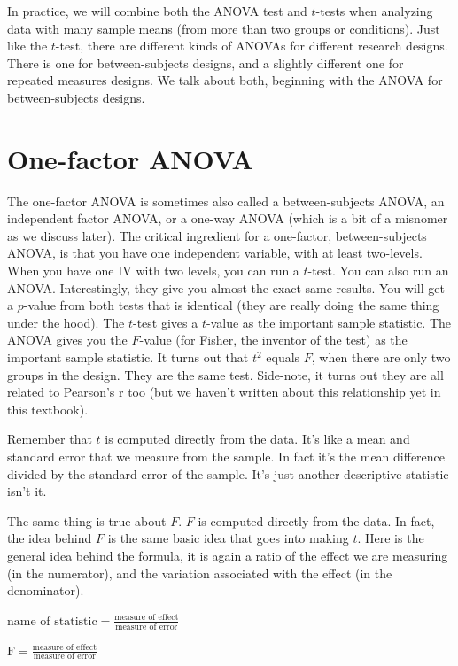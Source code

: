\documentclass[]{book}
\begin{document}
In practice, we will combine both the ANOVA test and \(t\)-tests when analyzing data with many sample means (from more than two groups or conditions). Just like the \(t\)-test, there are different kinds of ANOVAs for different research designs. There is one for between-subjects designs, and a slightly different one for repeated measures designs. We talk about both, beginning with the ANOVA for between-subjects designs.

\hypertarget{one-factor-anova}{%
\section{One-factor ANOVA}\label{one-factor-anova}}

The one-factor ANOVA is sometimes also called a between-subjects ANOVA, an independent factor ANOVA, or a one-way ANOVA (which is a bit of a misnomer as we discuss later). The critical ingredient for a one-factor, between-subjects ANOVA, is that you have one independent variable, with at least two-levels. When you have one IV with two levels, you can run a \(t\)-test. You can also run an ANOVA. Interestingly, they give you almost the exact same results. You will get a \(p\)-value from both tests that is identical (they are really doing the same thing under the hood). The \(t\)-test gives a \(t\)-value as the important sample statistic. The ANOVA gives you the \(F\)-value (for Fisher, the inventor of the test) as the important sample statistic. It turns out that \(t^2\) equals \(F\), when there are only two groups in the design. They are the same test. Side-note, it turns out they are all related to Pearson's r too (but we haven't written about this relationship yet in this textbook).

Remember that \(t\) is computed directly from the data. It's like a mean and standard error that we measure from the sample. In fact it's the mean difference divided by the standard error of the sample. It's just another descriptive statistic isn't it.

The same thing is true about \(F\). \(F\) is computed directly from the data. In fact, the idea behind \(F\) is the same basic idea that goes into making \(t\). Here is the general idea behind the formula, it is again a ratio of the effect we are measuring (in the numerator), and the variation associated with the effect (in the denominator).

\(\text{name of statistic} = \frac{\text{measure of effect}}{\text{measure of error}}\)

\(\text{F} = \frac{\text{measure of effect}}{\text{measure of error}}\)
\end{document}

